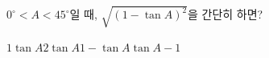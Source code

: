 $0^\circ<A<45^\circ$일 때, $\sqrt{(1-\tan A)^2}$을 간단히 하면?
\begin{choices32}{$1$}{$\tan A$}{$2\tan A$}{$1-\tan A$}{$\tan A-1$}\end{choices32}
